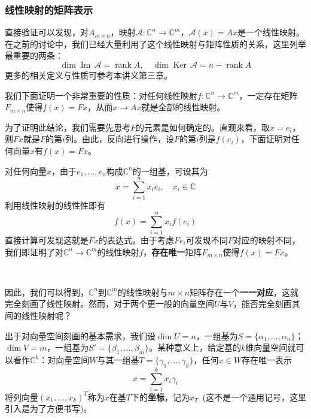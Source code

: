 \documentclass[a4paper,UTF8,fontset=windows]{ctexart}
\DeclareMathOperator{\rank}{rank}
\DeclareMathOperator{\im}{Im\,}
\DeclareMathOperator{\Ker}{Ker\,}
\begin{document}
\subsubsection{线性映射的矩阵表示}
直接验证可以发现，对$A_{m\times n}$，映射$\mathcal{A}:\mathbb{C}^n\to\mathbb{C}^m$，$\mathcal{A}(x)=Ax$是一个线性映射。在之前的讨论中，我们已经大量利用了这个线性映射与矩阵性质的关系，这里列举最重要的两条：
$$\dim\im\mathcal{A}=\rank A,\quad\dim\Ker\mathcal{A}=n-\rank A$$
更多的相关定义与性质可参考本讲义第三章。

我们下面证明一个非常重要的性质：对任何线性映射$f:\mathbb{C}^n\to\mathbb{C}^m$，一定存在矩阵$F_{m\times n}$使得$f(x)=Fx$，从而$x\to Ax$就是全部的线性映射。

为了证明此结论，我们需要先思考$F$的元素是如何确定的。直观来看，取$x=e_i$，则$Fx$就是$F$的第$i$列。由此，反向进行操作，设$F$的第$i$列是$f(e_i)$，下面证明对任何向量$x$有$f(x)=Fx$。

对任何向量$x$，由于$e_1,\dots,e_n$构成$\mathbb{C}^n$的一组基，可设其为
$$x=\sum_{i=1}^nx_ie_i,\quad x_i\in\mathbb{C}$$
利用线性映射的线性性即有
$$f(x)=\sum_{i=1}^nx_if(e_i)$$
直接计算可发现这就是$Fx$的表达式。由于考虑$Fe_i$可发现不同$F$对应的映射不同，我们即证明了对$\mathbb{C}^n\to\mathbb{C}^m$的线性映射$f$，\textbf{存在唯一}矩阵$F_{m\times n}$使得$f(x)=Fx$。

\

因此，我们可以得到，$\mathbb{C}^n$到$\mathbb{C}^m$的线性映射与$m\times n$矩阵存在一个\textbf{一一对应}，这就完全刻画了线性映射。然而，对于两个更一般的向量空间$U$与$V$，能否完全刻画其间的线性映射呢？

出于对向量空间刻画的基本需求，我们设$\dim U=n$，一组基为$S=\{\alpha_1,\dots,\alpha_n\}$；$\dim V=m$，一组基为$S'=\{\beta_1,\dots,\beta_m\}$。某种意义上，给定基的$k$维向量空间就可以看作$\mathbb{C}^k$：对向量空间$W$与其一组基$T=\{\gamma_1,\dots,\gamma_k\}$，任何$x\in W$存在唯一表示
$$x=\sum_{i=1}^kx_i\gamma_i$$
将列向量$(x_1,\dots,x_k)^T$称为$x$在基$T$下的\textbf{坐标}，记为$x_T$\ (这不是一个通用记号，这里引入是为了方便书写)。
\end{document}
